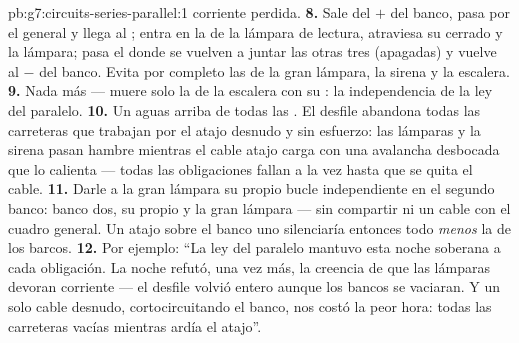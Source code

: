 \begin{solution}{pb:g7:circuits-series-parallel:1}
corriente perdida.
\textbf{8.} Sale del $+$ del banco, pasa por el 
general y llega al ; entra en la  de la lámpara de
lectura, atraviesa su  cerrado y la lámpara; pasa el
 donde se vuelven a juntar las otras tres 
(apagadas) y vuelve al $-$ del banco. Evita por completo las
 de la gran lámpara, la sirena y la escalera.
\textbf{9.} Nada más --- muere solo la  de la escalera con su
: la independencia de la ley del paralelo.
\textbf{10.} Un  aguas arriba de todas las . El
desfile abandona todas las carreteras que trabajan por el atajo
desnudo y sin esfuerzo: las lámparas y la sirena pasan hambre mientras
el cable atajo carga con una avalancha desbocada que lo calienta ---
todas las obligaciones fallan a la vez hasta que se quita el cable.
\textbf{11.} Darle a la gran lámpara su propio bucle independiente en
el segundo banco: banco dos, su propio  y la gran
lámpara --- sin compartir ni un cable con el cuadro general. Un atajo
sobre el banco uno silenciaría entonces todo \emph{menos} la  de
los barcos.
\textbf{12.} Por ejemplo: ``La ley del paralelo mantuvo esta noche
soberana a cada obligación. La noche refutó, una vez más, la creencia
de que las lámparas devoran corriente --- el desfile volvió entero
aunque los bancos se vaciaran. Y un solo cable desnudo, cortocircuitando
el banco, nos costó la peor hora: todas las carreteras vacías mientras
ardía el atajo''.
\end{solution}
